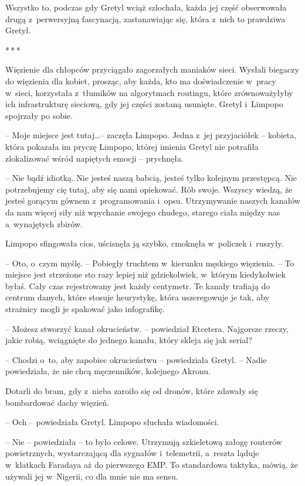 \documentclass[oneside,polish,11pt,sfheadings]{mwbk}
\newcommand{\threeast}{\bigskip\par\centerline{*\,*\,*}\medskip\par}
\begin{document}
Wszystko to, podczas gdy Gretyl wciąż szlochała, każda jej część
obserwowała drugą z~perwersyjną fascynacją, zastanawiając się, która z~nich to prawdziwa Gretyl.

\threeast

Więzienie dla chłopców przyciągało zagorzałych maniaków sieci. Wysłali
biegaczy do więzienia dla kobiet, prosząc, aby każda, kto ma
doświadczenie w~pracy w~sieci, korzystała z~tłumików na algorytmach
routingu, które zrównoważyłyby ich infrastrukturę sieciową, gdy jej
części zostaną usunięte. Gretyl i~Limpopo spojrzały po sobie.

-- Moje miejsce jest tutaj\ldots  -- zaczęła Limpopo. Jedna z~jej przyjaciółek
-- kobieta, która pokazała im pryczę Limpopo, której imienia Gretyl nie
potrafiła zlokalizować wśród napiętych emocji -- prychnęła.

-- Nie bądź idiotką. Nie jesteś naszą babcią, jesteś tylko kolejnym
przestępcą. Nie potrzebujemy cię tutaj, aby się nami opiekować. Rób
swoje. Wszyscy wiedzą, że jesteś gorącym gównem z~programowania i~opsu.
Utrzymywanie naszych kanałów da nam więcej siły niż wpychanie swojego
chudego, starego ciała między nas a~wynajętych zbirów.

Limpopo sfingowała cios, uścisnęła ją szybko, cmoknęła w~policzek i~ruszyły.

-- Oto, o~czym myślę. -- Pobiegły truchtem w~kierunku męskiego więzienia.
-- To miejsce jest strzeżone sto razy lepiej niż gdziekolwiek, w~którym
kiedykolwiek byłaś. Cały czas rejestrowany jest każdy centymetr. Te
kanały trafiają do centrum danych, które stosuje heurystykę, która
uszeregowuje je tak, aby strażnicy mogli je spakować jako infografikę.

-- Możesz stworzyć kanał okrucieństw. -- powiedział Etcetera. Najgorsze
rzeczy, jakie robią, wciągnięte do jednego kanału, który skleja się jak
serial?

-- Chodzi o~to, aby zapobiec okrucieństwu -- powiedziała Gretyl. -- Nadie
powiedziała, że nie chcą męczenników, kolejnego Akronu.

Dotarli do bram, gdy z~nieba zaroiło się od dronów, które zdawały się
bombardować dachy więzień.

-- Och -- powiedziała Gretyl. Limpopo słuchała wiadomości.

-- Nie -- powiedziała -- to było celowe. Utrzymują szkieletową załogę
routerów powietrznych, wystarczającą dla sygnałów i~telemetrii, a~reszta
ląduje w~klatkach Faradaya aż do pierwszego EMP. To standardowa taktyka,
mówią, że używali jej w~Nigerii, co dla mnie nie ma sensu.
\end{document}
